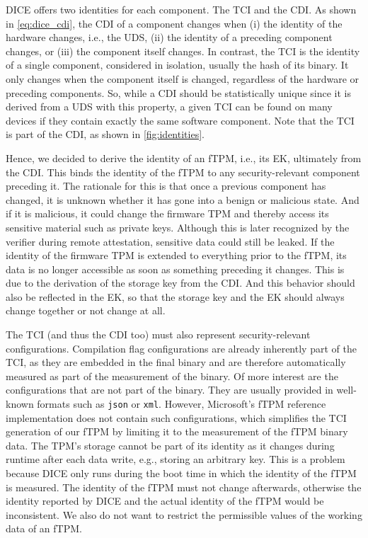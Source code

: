 DICE offers two identities for each component.
The TCI and the CDI\@.
As shown in \autoref{eq:dice_cdi}, the CDI of a component changes when (i) the identity of the hardware changes, i.e., the UDS, (ii) the identity of a preceding component changes, or (iii) the component itself changes.
In contrast, the TCI is the identity of a single component, considered in isolation, usually the hash of its binary.
It only changes when the component itself is changed, regardless of the hardware or preceding components.
So, while a CDI should be statistically unique since it is derived from a UDS with this property, a given TCI can be found on many devices if they contain exactly the same software component.
Note that the TCI is part of the CDI, as shown in \autoref{fig:identities}.



Hence, we decided to derive the identity of an fTPM, i.e., its EK, ultimately from the CDI\@.
This binds the identity of the fTPM to any security-relevant component preceding it.
The rationale for this is that once a previous component has changed, it is unknown whether it has gone into a benign or malicious state.
And if it is malicious, it could change the firmware TPM and thereby access its sensitive material such as private keys.
Although this is later recognized by the verifier during remote attestation, sensitive data could still be leaked.
If the identity of the firmware TPM is extended to everything prior to the fTPM, its data is no longer accessible as soon as something preceding it changes.
This is due to the derivation of the storage key from the CDI\@.
And this behavior should also be reflected in the EK, so that the storage key and the EK should always change together or not change at all.

The TCI (and thus the CDI too) must also represent security-relevant configurations.
Compilation flag configurations are already inherently part of the TCI, as they are embedded in the final binary and are therefore automatically measured as part of the measurement of the binary.
Of more interest are the configurations that are not part of the binary.
They are usually provided in well-known formats such as \texttt{json} or \texttt{xml}.
However, Microsoft's fTPM reference implementation does not contain such configurations, which simplifies the TCI generation of our fTPM by limiting it to the measurement of the fTPM binary data.
The TPM's storage cannot be part of its identity as it changes during runtime after each data write, e.g., storing an arbitrary key.
This is a problem because DICE only runs during the boot time in which the identity of the fTPM is measured.
The identity of the fTPM must not change afterwards, otherwise the identity reported by DICE and the actual identity of the fTPM would be inconsistent.
We also do not want to restrict the permissible values of the working data of an fTPM\@.

